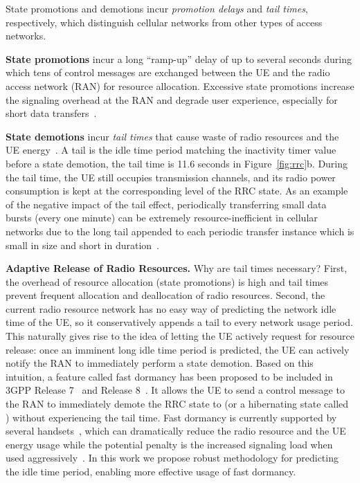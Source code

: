 State promotions and demotions incur \emph{promotion delays} and \emph{tail times}, respectively, which distinguish cellular networks from other types of access networks.

\textbf{State promotions} incur a long ``ramp-up'' delay of up to several seconds during which tens of control messages are exchanged between the UE and the radio access network (RAN) for resource allocation. Excessive state promotions increase the signaling overhead at the RAN and degrade user experience, especially for short data transfers~\cite{3gpp:090941, qian10_icnp}.

\textbf{State demotions} incur \emph{tail times} that cause waste of radio resources and the UE energy~\cite{imc.tailender, imc.3g}. A tail is the idle time period matching the inactivity timer value before a state demotion, \eg the tail time is 11.6 seconds in Figure~\ref{fig:rrc}b. During the tail time, the UE still occupies transmission channels, and its radio power consumption is kept at the corresponding level of the RRC state.
As an example of the negative impact of the tail effect, periodically transferring small data bursts (\eg every one minute) can be extremely resource-inefficient in cellular networks due to the long tail appended to each periodic transfer instance which is small in size and short in duration~\cite{qian12_www}.


\textbf{Adaptive Release of Radio Resources.} Why are tail times necessary? First, the overhead of resource allocation (\ie state promotions) is high and tail times prevent frequent allocation and deallocation of radio resources. Second, the current radio resource network has no easy way of predicting the network idle time of the UE, so it conservatively appends a tail to every network usage period. This naturally gives rise to the idea of letting the UE actively request for resource release: once an imminent long idle time period is predicted, the UE can actively notify the RAN to immediately perform a state demotion. Based on this intuition, a feature called fast dormancy has been proposed
to be included in 3GPP Release 7~\cite{fast.dormancy.1} and Release 8~\cite{fast.dormancy.2}. It allows the UE to send a control message to the RAN to immediately demote the RRC state to \RI (or a hibernating state called \RPCH) without experiencing the tail time. Fast dormancy is currently supported by several handsets~\cite{fast.dormancy.2}, which can dramatically reduce the radio resource and the UE energy usage while the potential penalty is the increased signaling load when used aggressively~\cite{3gpp:090941, qian10_icnp}. In this work we propose robust methodology for predicting the idle time period, enabling more effective usage of fast dormancy.



